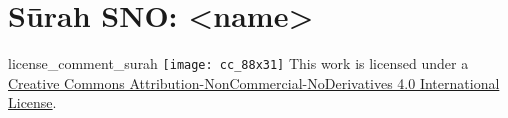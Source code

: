\begin{comment}
The following strings are to be replaced by a script, in order to use this file as a template (all upper case):-
* sNO = sūrah number, without leading zeros
* sZO = sūrah number, with leading zeros
\end{comment}
\begin{comment}
The following tags are declared here:-
license_comment_surah
\end{comment}
\section{Sūrah SNO: <name>}
\END

\begin{taggedblock}{license_comment_surah}
\texttt{[image: cc\_88x31]}
This work is licensed under a 
\href{http://creativecommons.org/licenses/by-nc-nd/4.0/}{Creative Commons Attribution-NonCommercial-NoDerivatives 4.0 International License}.
\end{taggedblock}